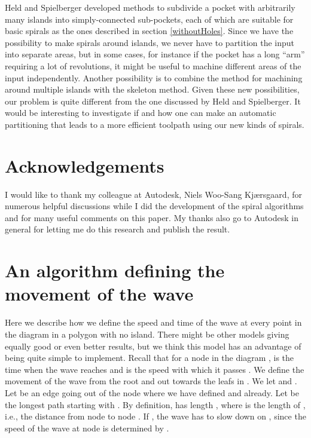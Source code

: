 \documentclass[3p]{elsarticle}
\begin{document}
Held and Spielberger \cite{held2014} developed methods to subdivide a pocket with arbitrarily many
islands into simply-connected sub-pockets, each of which are suitable for basic spirals as the ones
described in section \ref{withoutHoles}. Since we have the possibility to make spirals around islands,
we never have to partition the input into separate areas, but in some cases, for instance if the
pocket has a long ``arm'' requiring a lot of revolutions, it might be useful to machine
different areas of the input independently. Another possibility is to combine the method for
machining around multiple islands with the skeleton method.
Given these new possibilities, our problem is quite different from the one
discussed by Held and Spielberger. It would be interesting to investigate if and how one can
make an automatic partitioning that leads to a more efficient toolpath using our new kinds of spirals.

\section*{Acknowledgements}

I would like to thank my colleague at Autodesk,
Niels Woo-Sang Kj\ae rsgaard, for numerous helpful discussions while I did
the development of the spiral algorithms and for many useful comments on this paper.
My thanks also go to Autodesk in general for letting me do this research and publish the
result.


{}


\newpage
\appendix
\section{An algorithm defining the movement of the wave}\label{appA}

Here we describe how we define the speed and time of the wave at every point in the diagram
 in a polygon  with no island.
There might be other models giving equally good or even better
results, but we think this model has an advantage of being quite simple to implement.
Recall that for a node  in the diagram ,  is the time when the wave
reaches  and  is the speed with which it passes .
We define the movement of the wave from the root and out towards the leafs in
.
We let  and .
Let  be an edge going out of the node  where we have
defined  and  already. Let  be
the longest path starting with . By definition,
 has length , where  is the length of , i.e.,
the distance from node  to node .
If , the wave has to slow down on , since the speed of the wave at node 
is determined by .
\end{document}
